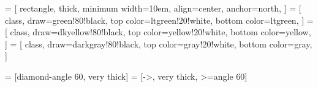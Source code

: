 %
%


\newcommand{\umlclass}[2]{\begin{minipage}{\maxof{\widthof{#1}+1em}{10em}}\parbox{\textwidth}{\centering #1}
\vspace*{-8pt} \hrule \vspace*{4pt} \parbox{\textwidth}{#2} \end{minipage}}
\newcommand{\umltype}[1]{$\ll$type$\gg$\\ #1}
\newcommand{\umlemptyclass}[1]{#1}

 = [
  rectangle,
  thick,
  minimum width=10em,
  align=center,
  anchor=north,
]
 = [
  class,
  draw=green!80!black,
  top color=ltgreen!20!white,
  bottom color=ltgreen,
]
 = [
  class,
  draw=dkyellow!80!black,
  top color=yellow!20!white,
  bottom color=yellow,
]
 = [
  class,
  draw=darkgray!80!black,
  top color=gray!20!white,
  bottom color=gray,
]

 = [diamond-angle 60, very thick]
 = [->, very thick, >=angle 60]


